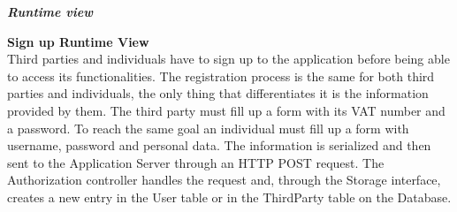 \begin{legal}
		\item \textit{\textbf{Runtime view}}\\
			\begin{legal}
				\item \textbf{Sign up Runtime View}\\
Third parties and individuals have to sign up to the application before being able to access its functionalities.
The registration process is the same for both third parties and individuals, the only thing that differentiates it  is the information provided by them.
The third party must fill up a form with its VAT number and a password. To reach the same goal an individual must fill up a form with username, password and personal data.
The information is serialized and then sent to the Application Server through an HTTP POST request.
The Authorization controller handles the request and, through the Storage interface, creates a new
entry in the User table or in the ThirdParty table on the Database. \\
				

\end{legal}
\end{legal}
